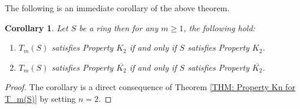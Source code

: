 \documentclass[12pt]{amsart}
\newtheorem{cor}[theorem]{Corollary}
\theoremstyle{definition}
\numberwithin{equation}{section}
\begin{document}
The following is an immediate corollary of the above theorem. 
\begin{cor}\cite[Proposition~2.18]{khurana2018idempotents}\label{COR: Property K2 for T_m(S)}
 Let $S$ be a ring then for any $m \geq 1$, the following hold:
 \begin{enumerate}
     \item $T_m(S)$ satisfies Property $K_2$ if and only if $S$ satisfies Property $K_2$. 
     \item $T_m(S)$ satisfies Property $\overline{K_2}$ if and only if $S$ satisfies Property $\overline{K_2}$.      
 \end{enumerate}
\end{cor}
\begin{proof}
    The corollary is a direct consequence of Theorem \ref{THM: Property Kn for T_m(S)} by setting $n=2$. 
\end{proof}
\end{document}
